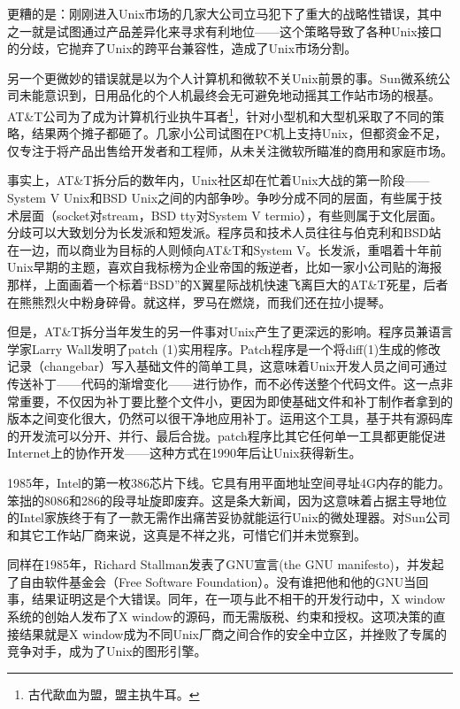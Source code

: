 \documentclass[12pt,oneside]{book}
\begin{document}
\begin{common-format}
更糟的是：刚刚进入Unix市场的几家大公司立马犯下了重大的战略性错误，其中之一就是试图通过产品差异化来寻求有利地位——这个策略导致了各种Unix接口的分歧，它抛弃了Unix的跨平台兼容性，造成了Unix市场分割。

另一个更微妙的错误就是以为个人计算机和微软不关Unix前景的事。Sun微系统公司未能意识到，日用品化的个人机最终会无可避免地动摇其工作站市场的根基。AT\&{}T公司为了成为计算机行业执牛耳者\footnote{古代歃血为盟，盟主执牛耳。}，针对小型机和大型机采取了不同的策略，结果两个摊子都砸了。几家小公司试图在PC机上支持Unix，但都资金不足，仅专注于将产品出售给开发者和工程师，从未关注微软所瞄准的商用和家庭市场。

事实上，AT\&{}T拆分后的数年内，Unix社区却在忙着Unix大战的第一阶段——System V Unix和BSD Unix之间的内部争吵。争吵分成不同的层面，有些属于技术层面（socket对stream，BSD tty对System V termio），有些则属于文化层面。分歧可以大致划分为长发派和短发派。程序员和技术人员往往与伯克利和BSD站在一边，而以商业为目标的人则倾向AT\&{}T和System V。长发派，重唱着十年前Unix早期的主题，喜欢自我标榜为企业帝国的叛逆者，比如一家小公司贴的海报那样，上面画着一个标着“BSD”的X翼星际战机快速飞离巨大的AT\&{}T死星，后者在熊熊烈火中粉身碎骨。就这样，罗马在燃烧，而我们还在拉小提琴。

但是，AT\&{}T拆分当年发生的另一件事对Unix产生了更深远的影响。程序员兼语言学家Larry Wall发明了patch (1)实用程序。Patch程序是一个将diff(1)生成的修改记录（changebar）写入基础文件的简单工具，这意味着Unix开发人员之间可通过传送补丁——代码的渐增变化——进行协作，而不必传送整个代码文件。这一点非常重要，不仅因为补丁要比整个文件小，更因为即使基础文件和补丁制作者拿到的版本之间变化很大，仍然可以很干净地应用补丁。运用这个工具，基于共有源码库的开发流可以分开、并行、最后合拢。patch程序比其它任何单一工具都更能促进Internet上的协作开发——这种方式在1990年后让Unix获得新生。

1985年，Intel的第一枚386芯片下线。它具有用平面地址空间寻址4G内存的能力。笨拙的8086和286的段寻址旋即废弃。这是条大新闻，因为这意味着占据主导地位的Intel家族终于有了一款无需作出痛苦妥协就能运行Unix的微处理器。对Sun公司和其它工作站厂商来说，这真是不祥之兆，可惜它们并未觉察到。

同样在1985年，Richard Stallman发表了GNU宣言(the GNU manifesto)\cite{Stallman}，并发起了自由软件基金会（Free Software Foundation）。没有谁把他和他的GNU当回事，结果证明这是个大错误。同年，在一项与此不相干的开发行动中，X window系统的创始人发布了X window的源码，而无需版税、约束和授权。这项决策的直接结果就是X window成为不同Unix厂商之间合作的安全中立区，并挫败了专属的竞争对手，成为了Unix的图形引擎。


\end{common-format}
\end{document}
